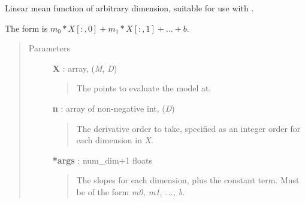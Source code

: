 \documentclass[letterpaper,10pt,english]{sphinxmanual}
\begin{document}
\begin{fulllineitems}
\label{gptools:gptools.mean.linear}
Linear mean function of arbitrary dimension, suitable for use with {\hyperref[gptools:gptools.mean.MeanFunction]{}}.

The form is \(m_0 * X[:, 0] + m_1 * X[:, 1] + \dots + b\).
\begin{quote}\begin{description}
\item[{Parameters}] \leavevmode
\textbf{X} : array, (\emph{M}, \emph{D})
\begin{quote}

The points to evaluate the model at.
\end{quote}

\textbf{n} : array of non-negative int, (\emph{D})
\begin{quote}

The derivative order to take, specified as an integer order for each
dimension in \emph{X}.
\end{quote}

\textbf{*args} : num\_dim+1 floats
\begin{quote}

The slopes for each dimension, plus the constant term. Must be of the
form \emph{m0, m1, ..., b}.
\end{quote}

\end{description}\end{quote}

\end{fulllineitems}

\end{document}
